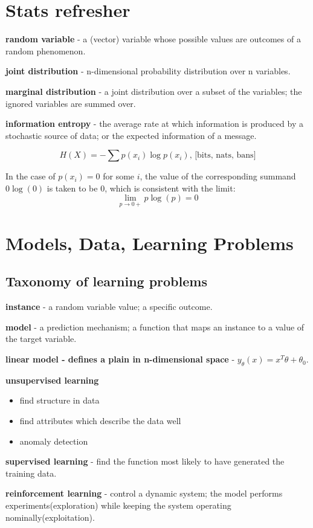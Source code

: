 \documentclass{article}
\newcommand{\para}[0]{\par\vspace{0.2cm}\noindent}
\newcommand{\define}[2]{\textbf{#1} - {#2}.  \para}
\begin{document}
\section{Stats refresher}
\define{random variable}
           {a (vector) variable whose possible values are outcomes of a random phenomenon}
\define{joint distribution}
           {n-dimensional probability distribution over n variables}
\define{marginal distribution}
           {a joint distribution over a subset of the variables; the ignored variables are summed over}
\define{information entropy}
           {the average rate at which information is produced by a stochastic source of data; or the expected information of a message}
$$ H(X) = - \sum p(x_i) \log p(x_i) \text{,  [bits, nats, bans]}$$
\para
In the case of $p(x_i) = 0$ for some $i$, the value of the corresponding summand $0 \log(0)$ is taken to be 0, which is consistent with the limit:
$$ \lim_{p \to 0+} p \log(p) = 0$$

\section{Models, Data, Learning Problems}
\subsection{Taxonomy of learning problems}
\define{instance}
           {a random variable value; a specific outcome}
\define{model}
           {a prediction mechanism; a function that maps an instance to a value of the target variable}
\define{linear model - defines a plain in n-dimensional space}
           {$y_\theta(x) = x^T \theta + \theta_0$}
\textbf{unsupervised learning}
           \begin{itemize}
                \item{find structure in data}
                \item{find attributes which describe the data well}
                \item{anomaly detection}
           \end{itemize}
\para
\define{supervised learning}
           {find the function most likely to have generated the training data}
\define{reinforcement learning}
           {control a dynamic system; the model performs experiments(exploration) while keeping the system operating nominally(exploitation)}
\end{document}
